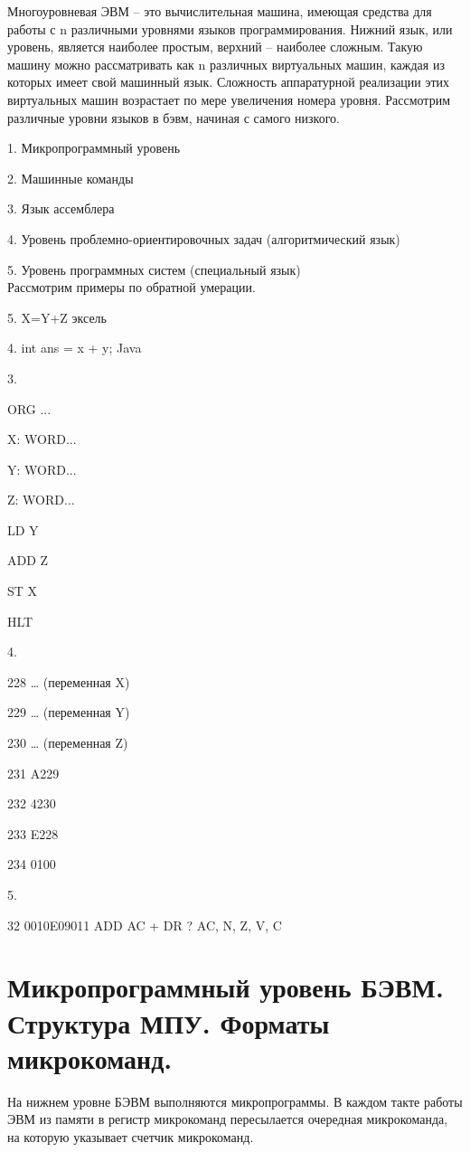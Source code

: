 \documentclass{article}
\begin{document}
Многоуровневая ЭВМ – это вычислительная машина, имеющая средства для работы с n различными уровнями языков программирования. 
Нижний язык, или уровень, является наиболее простым, верхний – наиболее сложным. 
Такую машину можно рассматривать как n различных виртуальных машин, каждая из которых имеет свой машинный язык. 
Сложность аппаратурной реализации этих виртуальных машин возрастает по мере увеличения номера уровня.
Рассмотрим различные уровни языков в бэвм, начиная с самого низкого. 

1. Микропрограммный уровень

2. Машинные команды

3. Язык ассемблера

4. Уровень проблемно-ориентировочных задач (алгоритмический язык)

5. Уровень программных систем (специальный язык)
\\
Рассмотрим примеры по обратной умерации.

5. X=Y+Z эксель

4. int ans = x + y; Java

3.

ORG  ...

X: WORD...

Y: WORD...

Z: WORD...

   LD Y

   ADD Z

   ST X

   HLT

4.

228 … (переменная X)

229 … (переменная Y)

230 … (переменная Z)

231 A229 

232 4230 

233 E228 

234 0100 

5.

32 0010E09011   ADD  AC + DR ? AC, N, Z, V, C
\section{Микропрограммный уровень БЭВМ. Структура МПУ. Форматы микрокоманд.}

На нижнем уровне БЭВМ выполняются микропрограммы. 
В каждом такте работы ЭВМ из памяти в регистр микрокоманд пересылается очередная 
микрокоманда, на которую указывает счетчик микрокоманд.
\end{document}
